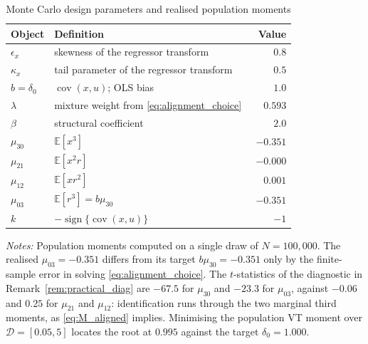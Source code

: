 \begin{table}[htbp]
\centering
\caption{Monte Carlo design parameters and realised population moments}
\label{tab:dgp_params}
\begin{threeparttable}
\begin{tabular}{llr}
\toprule
Object & Definition & Value \\
\midrule
\(\epsilon_x\)      & skewness of the regressor transform            & \(0.8\) \\
\(\kappa_x\)        & tail parameter of the regressor transform      & \(0.5\) \\
\(b=\delta_0\)      & \(\operatorname{cov}(x,u)\); OLS bias           & \(1.0\) \\
\(\lambda\)         & mixture weight from \eqref{eq:alignment_choice} & \(0.593\) \\
\(\beta\)           & structural coefficient                          & \(2.0\) \\
\midrule
\(\mu_{30}\)        & \(\mathbb E[x^{3}]\)                            & \(-0.351\) \\
\(\mu_{21}\)        & \(\mathbb E[x^{2}r]\)                           & \(-0.000\) \\
\(\mu_{12}\)        & \(\mathbb E[xr^{2}]\)                           & \(\phantom{-}0.001\) \\
\(\mu_{03}\)        & \(\mathbb E[r^{3}]=b\mu_{30}\)                  & \(-0.351\) \\
\(k\)               & \(-\operatorname{sign}\{\operatorname{cov}(x,u)\}\) & \(-1\) \\
\bottomrule
\end{tabular}
\begin{tablenotes}
\small
\item \textit{Notes:} Population moments computed on a single draw of
\(N=100{,}000\). The realised \(\mu_{03}=-0.351\) differs from its target
\(b\mu_{30}=-0.351\) only by the finite-sample error in solving
\eqref{eq:alignment_choice}. The \(t\)-statistics of the diagnostic in
Remark~\ref{rem:practical_diag} are \(-67.5\) for \(\mu_{30}\) and \(-23.3\) for
\(\mu_{03}\), against \(-0.06\) and \(0.25\) for \(\mu_{21}\) and \(\mu_{12}\):
identification runs through the two marginal third moments, as
\eqref{eq:M_aligned} implies. Minimising the population VT moment over
\(\mathcal D=[0.05,5]\) locates the root at \(0.995\) against the target
\(\delta_0=1.000\).
\end{tablenotes}
\end{threeparttable}
\end{table}
